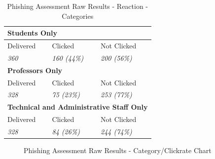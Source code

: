 \documentclass[a4paper]{article}
\begin{document}
\newpage

\begingroup
\renewcommand{\arraystretch}{1.25}
\begin{table}[ht]
\begin{center}
    \begin{tabular}{ | m{12.3em} | m{12.3em} | m{12.3em} | }
    \hline
    \multicolumn{3}{|l|}{\textbf{Students Only}} \\
    \hline
    Delivered & Clicked & Not Clicked \\
    \hline
    \textit{360} & \textit{160 (44\%)} & \textit{200 (56\%)} \\
    \hline
    \multicolumn{3}{|l|}{\textbf{Professors Only}} \\
    \hline
    Delivered & Clicked & Not Clicked \\
    \hline
    \textit{328} & \textit{75 (23\%)} & \textit{253 (77\%)} \\
    \hline
    \multicolumn{3}{|l|}{\textbf{Technical and Administrative Staff Only}} \\
    \hline
    Delivered & Clicked & Not Clicked \\
    \hline
    \textit{328} & \textit{84 (26\%)} & \textit{244 (74\%)} \\
    \hline
    \end{tabular}
\end{center}
\caption{Phishing Assessment Raw Results - Reaction - Categories}
\label{t-varreact0-cat}
\end{table}

\vspace{5mm}

\begin{figure}[H]
	\centering
	\caption{Phishing Assessment Raw Results - Category/Clickrate Chart}
	\label{chart-cat}
\end{figure}
\end{document}
